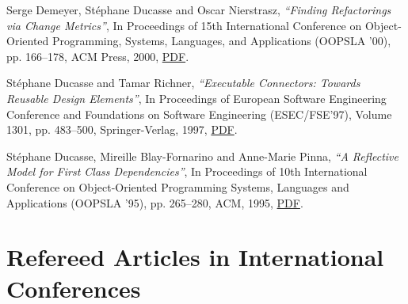 \documentclass{article}
\newcommand{\czauthors}[1]{#1}
\newcommand{\cztitle}[1]{\emph{``#1''}}
\newcommand{\czbooktitle}[1]{#1}
\begin{document}
\begin{itemize}
	\pub  \czauthors{Serge Demeyer, St\'ephane Ducasse and Oscar Nierstrasz},  \cztitle{Finding Refactorings via Change Metrics},  In \czbooktitle{Proceedings of 15th International Conference on Object-Oriented Programming, Systems, Languages, and Applications (OOPSLA '00)}, pp. 166--178, ACM Press, 2000, \href{http://rmod-files.lille.inria.fr/Team/Texts/Papers/Deme00a-OOPSLA00-FindingRefactoring.pdf}{PDF}.

	\pub  \czauthors{St\'ephane Ducasse and Tamar Richner},  \cztitle{Executable Connectors: Towards Reusable Design Elements},  In \czbooktitle{Proceedings of European Software Engineering Conference and Foundations on Software Engineering (ESEC/FSE'97)}, Volume 1301, pp. 483--500, Springer-Verlag, 1997, \href{http://rmod-files.lille.inria.fr/Team/Texts/Papers/Duca97bExecutableConnectors.pdf}{PDF}.

	\pub  \czauthors{St\'ephane Ducasse, Mireille Blay-Fornarino and Anne-Marie Pinna},  \cztitle{A Reflective Model for First Class Dependencies},  In \czbooktitle{Proceedings of 10th International Conference on Object-Oriented Programming Systems, Languages and Applications (OOPSLA '95)}, pp. 265--280, ACM, 1995, \href{http://rmod-files.lille.inria.fr/Team/Texts/Papers/Duca95bAReflectiveModel.pdf}{PDF}.

\end{itemize}\section{Refereed Articles in International Conferences}
\end{document}
